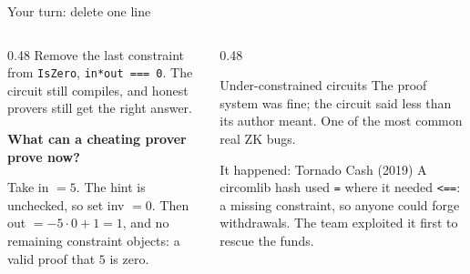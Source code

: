\ifdefined\PRESENTATION\else\PassOptionsToClass{handout}{beamer}\fi\documentclass[aspectratio=169, lualatex]{beamer}
\begin{document}
\begin{frame}{Your turn: delete one line}
	\begin{columns}[T]
		\begin{column}{0.48\textwidth}
			Remove the last constraint from \texttt{IsZero}, \texttt{in*out === 0}. The circuit still compiles, and honest provers still get the right answer.
			\vspace{0.2cm}

			\textbf{What can a cheating prover prove now?}
			\pause
			\vspace{0.2cm}

			Take in $= 5$. The hint is unchecked, so set inv $= 0$. Then out $= -5 \cdot 0 + 1 = 1$, and no remaining constraint objects: a valid proof that $5$ is zero.
		\end{column}
		\begin{column}{0.48\textwidth}
			\pause
			\begin{alertblock}{Under-constrained circuits}
				The proof system was fine; the circuit said less than its author meant. One of the most common real ZK bugs.
			\end{alertblock}
			\begin{exampleblock}{It happened: Tornado Cash (2019)}
				A circomlib hash used \texttt{=} where it needed \texttt{<==}: a missing constraint, so anyone could forge withdrawals. The team exploited it first to rescue the funds.
			\end{exampleblock}
		\end{column}
	\end{columns}
\end{frame}
\end{document}

